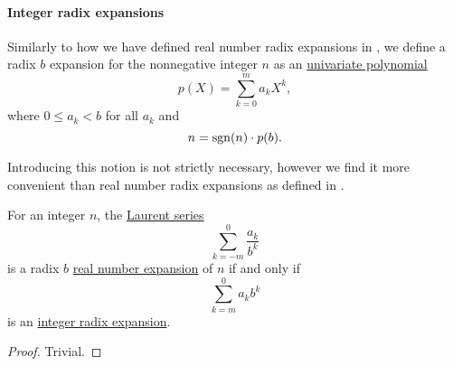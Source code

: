 \paragraph{Integer radix expansions}

\begin{definition}\label{def:integer_radix_expansion}
  Similarly to how we have defined real number radix expansions in , we define a radix \( b \) expansion for the nonnegative integer \( n \) as an \hyperref[def:univariate_polynomial]{univariate polynomial}
  \begin{equation*}
    p(X) = \sum_{k=0}^m a_k X^k,
  \end{equation*}
  where \( 0 \leq a_k < b \) for all \( a_k \) and
  \begin{equation*}
    n = \operatorname{sgn}(n) \cdot p(b).
  \end{equation*}
\end{definition}
\begin{comments}
  \item Introducing this notion is not strictly necessary, however we find it more convenient than real number radix expansions as defined in .
\end{comments}

\begin{proposition}\label{thm:integer_and_real_radix_expansions}
  For an integer \( n \), the \hyperref[def:formal_laurent_series]{Laurent series}
  \begin{equation}\label{eq:thm:integer_and_real_radix_expansions/series}
    \sum_{k=-m}^0 \frac {a_k} {b^k}
  \end{equation}
  is a radix \( b \) \hyperref[def:real_number_radix_expansion]{real number expansion} of \( n \) if and only if
  \begin{equation}\label{eq:thm:integer_and_real_radix_expansions/polynomial}
    \sum_{k=m}^0 a_k b^k
  \end{equation}
  is an \hyperref[def:integer_radix_expansion]{integer radix expansion}.
\end{proposition}
\begin{proof}
  Trivial.
\end{proof}

